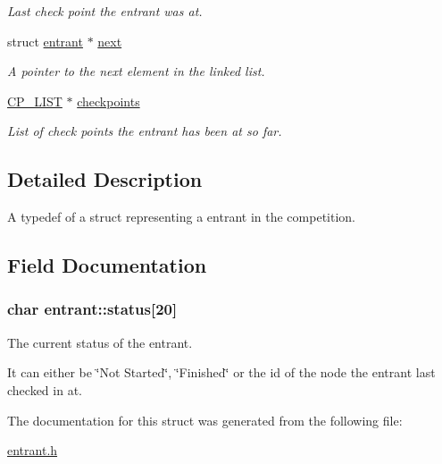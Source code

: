 \begin{DoxyCompactItemize}
\begin{DoxyCompactList}\small\item\em Last check point the entrant was at. \end{DoxyCompactList}\item 
\hypertarget{structentrant_ac1e0ab215104db8263e663d42558aa22}{struct \hyperlink{structentrant}{entrant} $\ast$ \hyperlink{structentrant_ac1e0ab215104db8263e663d42558aa22}{next}}\label{structentrant_ac1e0ab215104db8263e663d42558aa22}

\begin{DoxyCompactList}\small\item\em A pointer to the next element in the linked list. \end{DoxyCompactList}\item 
\hypertarget{structentrant_a0654f96eb21c02121b1a11c688106386}{\hyperlink{cp__time_8h_acb37ad9c25fbd95e093acd078be10932}{C\-P\-\_\-\-L\-I\-S\-T} $\ast$ \hyperlink{structentrant_a0654f96eb21c02121b1a11c688106386}{checkpoints}}\label{structentrant_a0654f96eb21c02121b1a11c688106386}

\begin{DoxyCompactList}\small\item\em List of check points the entrant has been at so far. \end{DoxyCompactList}\end{DoxyCompactItemize}



\subsection{Detailed Description}
A typedef of a struct representing a entrant in the competition. 

\subsection{Field Documentation}
\hypertarget{structentrant_a37176427e9cc8045ff719ddc71073e16}{
\subsubsection[{status}]{\setlength{\rightskip}{0pt plus 5cm}char entrant\-::status\mbox{[}20\mbox{]}}}\label{structentrant_a37176427e9cc8045ff719ddc71073e16}


The current status of the entrant. 

It can either be \char`\"{}\-Not Started\char`\"{}, \char`\"{}\-Finished\char`\"{} or the id of the node the entrant last checked in at. 

The documentation for this struct was generated from the following file\-:\begin{DoxyCompactItemize}
\item 
\hyperlink{entrant_8h}{entrant.\-h}\end{DoxyCompactItemize}
